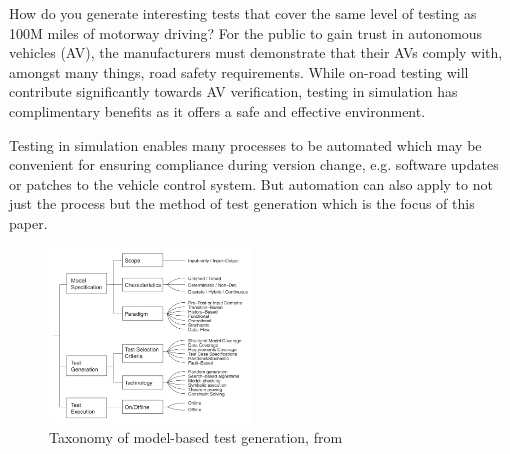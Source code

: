 \documentclass[letterpaper, 10 pt, journal, twoside]{IEEEtran}
\begin{document}
How do you generate interesting tests that cover the same level of testing as 100M miles of motorway driving?
%
For the public to gain trust in autonomous vehicles (AV), the manufacturers must demonstrate that their AVs comply with, amongst many things, road safety requirements. While on-road testing will contribute significantly towards AV verification, testing in simulation has complimentary benefits as it offers a safe and effective environment. 

%
 Testing in simulation enables many processes to be automated which may be convenient for ensuring compliance during version change, e.g. software updates or patches to the vehicle control system. But automation can also apply to not just the process but the method of test generation which is the focus of this paper.


\begin{figure}[!t]
	\centering
\includegraphics[width=0.48\textwidth]{taxonomy.png}
	\caption{Taxonomy of model-based test generation, from \cite{utting2012taxonomy}}
	\label{taxonomy}
\end{figure}
\end{document}
